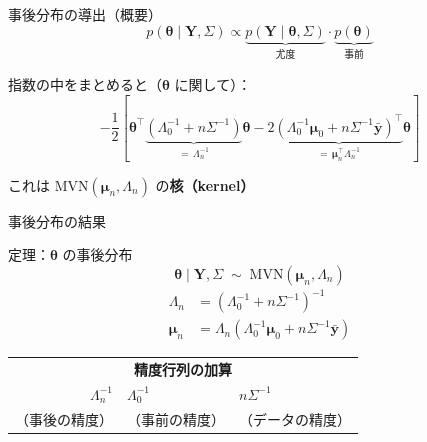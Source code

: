 \documentclass[lualatex,aspectratio=169,12pt]{beamer}
\newcommand{\mvn}{\mathrm{MVN}}
\begin{document}
\begin{frame}{事後分布の導出（概要）}
  \[
    p(\bm{\theta} \mid \bm{Y}, \Sigma)
    \propto \underbrace{p(\bm{Y}\mid\bm{\theta},\Sigma)}_{\text{尤度}}
            \cdot\underbrace{p(\bm{\theta})}_{\text{事前}}
  \]

  \bigskip
  指数の中をまとめると（$\bm{\theta}$ に関して）：
  \[
    -\frac{1}{2}\left[\bm{\theta}^\top\underbrace{\left(\Lambda_0^{-1} + n\Sigma^{-1}\right)}_{=\, \Lambda_n^{-1}}\bm{\theta}
    - 2\underbrace{\left(\Lambda_0^{-1}\bm{\mu}_0 + n\Sigma^{-1}\bar{\bm{y}}\right)^\top}_{=\,\bm{\mu}_n^\top\Lambda_n^{-1}}\bm{\theta}\right]
  \]

  \medskip
  これは $\mvn(\bm{\mu}_n, \Lambda_n)$ の\textbf{核（kernel）}
\end{frame}

\begin{frame}{事後分布の結果}
  \begin{block}{定理：$\bm{\theta}$ の事後分布}
    \[
      \bm{\theta} \mid \bm{Y}, \Sigma \;\sim\; \mvn(\bm{\mu}_n, \Lambda_n)
    \]
    \begin{align*}
      \Lambda_n &= \left(\Lambda_0^{-1} + n\Sigma^{-1}\right)^{-1} \\[4pt]
      \bm{\mu}_n &= \Lambda_n\left(\Lambda_0^{-1}\bm{\mu}_0 + n\Sigma^{-1}\bar{\bm{y}}\right)
    \end{align*}
  \end{block}

  \vspace{0.5em}
  \begin{center}
  \begin{tabular}{r@{\;=\;}l@{\;+\;}l}
    \multicolumn{3}{c}{\textbf{精度行列の加算}}\\[2pt]
    $\Lambda_n^{-1}$ & $\Lambda_0^{-1}$ & $n\Sigma^{-1}$ \\
    （事後の精度） & （事前の精度） & （データの精度）
  \end{tabular}
  \end{center}
\end{frame}
\end{document}
